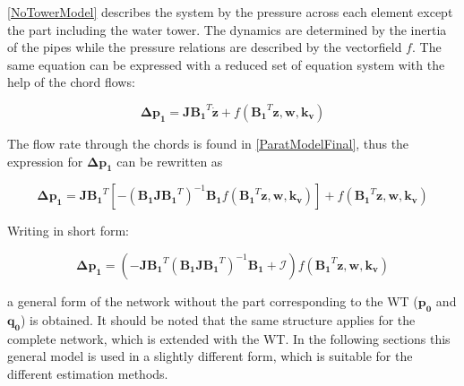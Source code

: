 \eqref{NoTowerModel} describes the system by the pressure across each element except the part including the water tower. The dynamics are determined by the inertia of the pipes while the pressure relations are described by the vectorfield $f$. 
The same equation can be expressed with a reduced set of equation system with the help of the chord flows: 

\begin{equation}
  \bm{\Delta p_1} =  \bm{J {B_1}}^T \bm{\dot{z}} + f({\bm{B_1}}^T \bm{z}, \bm{w}, \bm{k_v})
 \end{equation}

The flow rate through the chords is found in \eqref{ParatModelFinal}, thus the expression for $ \bm{\Delta p_1} $ can be rewritten as

\begin{equation}
 \bm{ \Delta p_1} = \bm{ J {B_1}}^T [- (\bm{B_1 J {B_1}}^T)^{-1}\bm{B_1} f({\bm{B_1}}^T \bm{z},\bm{ w}, \bm{k_v})] + f({\bm{B_1}}^T \bm{z},\bm{ w}, \bm{k_v})
  \label{PressureLarge}
 \end{equation}
 
Writing in short form:
 
 \begin{equation}
  \bm{\Delta p_1} =  (-\bm{J {B_1}}^T (\bm{B_1 J {B_1}}^T)^{-1}\bm{B_1} + \bm{\mathcal{I}}) f({\bm{B_1}}^T \bm{z}, \bm{w}, \bm{k_v})
  \label{PressureShort}
 \end{equation}

a general form of the network without the part corresponding to the WT ($\bm{p_0}$ and $\bm{q_0}$) is obtained. It should be noted that the same structure applies for the complete network, which is extended with the WT. In the following sections this general model is used in a slightly different form, which is suitable for the different estimation methods. 


